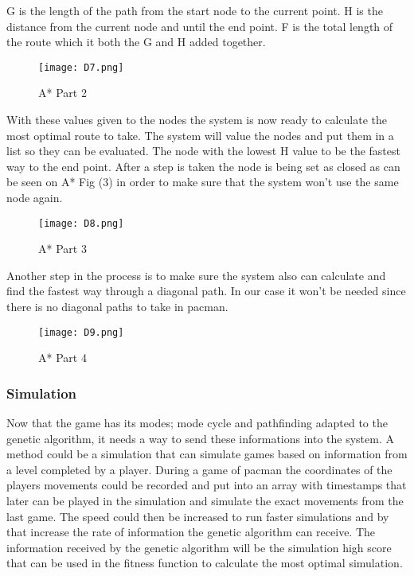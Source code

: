 G is the length of the path from the start node to the current point. 
H is the distance from the current node and until the end point.
F is the total length of the route which it both the G and H added together.


\begin{figure}[!htbp]
\centering
\texttt{[image: D7.png]}
\caption{  A* Part 2 }
\label{fig:A2}
\end{figure}


With these values given to the nodes the system is now ready to calculate the most optimal route to take. The system will value the nodes and put them in a list so they can be evaluated. The node with the lowest H value to be the fastest way to the end point. After a step is taken the node is being set as closed as can be seen on A* Fig (3) in order to make sure that the system won’t use the same node again. 


\begin{figure}[!htbp]
\centering
\texttt{[image: D8.png]}
\caption{  A* Part 3 }
\label{fig:A3}
\end{figure}


Another step in the process is to make sure the system also can calculate and find the fastest way through a diagonal path. In our case it won’t be needed since there is no diagonal paths to take in pacman.


\begin{figure}[!htbp]
\centering
\texttt{[image: D9.png]}
\caption{  A* Part 4 }
\label{fig:A4}
\end{figure}


\subsubsection{Simulation}

Now that the game has its modes; mode cycle and pathfinding adapted to the genetic algorithm, it needs a way to send these informations into the system. A method could be a simulation that can simulate games based on information from a level completed by a player. During a game of pacman the coordinates of the players movements could be recorded and put into an array with timestamps that later can be played in the simulation and simulate the exact movements from the last game. The speed could then be increased to run faster simulations and by that increase the rate of information the genetic algorithm can receive. The information received by the genetic algorithm will be the simulation high score that can be used in the fitness function to calculate the most optimal simulation.


